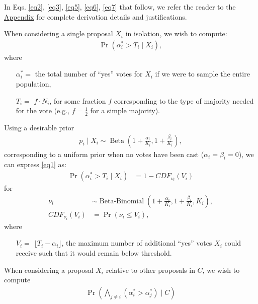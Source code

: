 \documentclass[chi_draft]{sigchi}
\begin{document}
In Eqs. \eqref{eq2}, \eqref{eq3}, \eqref{eq5}, \eqref{eq6}, \eqref{eq7} that follow, we refer the reader to the \hyperref[sec:derivation]{Appendix} for complete derivation details and justifications.

When considering a single proposal $X_i$ in isolation, we wish to compute:
\begin{align}\label{eq1}
\Pr(\alpha^*_i > T_i \mid X_i),
\end{align}
where
\begin{description}
\begin{itemize}
\item[$\alpha^*_i = $] the total number of ``yes'' votes for $X_i$ if we were to sample the entire population,
\item[$T_i = $] $f \cdot N_i$, for some fraction $f$ corresponding to the type of majority needed for the vote
(e.g., $f=\frac{1}{2}$ for a simple majority).
\end{itemize}
\end{description}
Using a desirable prior 
\begin{align}\label{eq2}
p_i \mid X_i \sim \operatorname{Beta}(1+\frac{\alpha_i}{K_i},1+\frac{\beta_i}{K_i}),
\end{align}
corresponding to a uniform prior when no votes have been cast ($\alpha_i = \beta_i = 0$), we can express \eqref{eq1} as:
\begin{align}\label{eq3}
\Pr(\alpha^*_i > T_i \mid X_i) &= 1 - {CDF}_{\nu_i}(V_i)
\end{align}
for
\begin{align*}
\nu_i & \sim \operatorname{Beta-Binomial}(1+\frac{\alpha_i}{K_i},1+\frac{\beta_i}{K_i}, K_i),\\
{CDF}_{\nu_i}(V_i) & = \Pr(\nu_i \leq V_i),
\end{align*}
where
\begin{description}
\begin{itemize}
\item[$V_i = $] $\lfloor{T_i - \alpha_i}\rfloor$, the maximum number of additional ``yes'' votes $X_i$ could receive such that it would remain below threshold.
\end{itemize}
\end{description}

When considering a proposal $X_i$ relative to other proposals in $C$, we wish to compute
\begin{align}\label{eq4}
\Pr\left(\bigwedge_{j \neq i} (\alpha^*_i > \alpha^*_j) \mid C\right)
\end{align}
\end{document}

